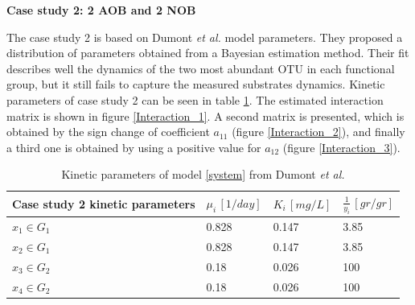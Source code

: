 \documentclass[3p,times]{article}
\begin{document}
\textbf{Case study 2: 2 AOB and 2 NOB}

 The case study 2 is based on Dumont \textit{et al.}\cite{Dumont2016} model parameters. They proposed a distribution of parameters obtained from a Bayesian estimation method. Their fit describes well the dynamics of the two most abundant OTU in each functional group, but it still fails to capture the measured substrates dynamics. Kinetic parameters of case study 2 can be seen in table \ref{kinetic_parameters}. The estimated interaction matrix is shown in figure \ref{Interaction_1}. A second matrix is presented, which is obtained by the sign change of coefficient $a_{11}$ (figure \ref{Interaction_2}), and finally a third one is obtained by using a positive value for $a_{12}$ (figure \ref{Interaction_3}). 

\begin{table}[ht]
	\centering
	\begin{tabular}{|l|l|l|l|}
		\hline
		Case study 2 kinetic parameters & $\mu_i\,[1/day]$ & $K_i\,[mg/L]$ & $\frac{1}{y_i} \, [gr/gr]$ \\ \hline
		$x_1 \in G_1$ & 0.828  & 0.147 & 3.85  \\ \hline
		$x_2\in G_1$ &0.828   & 0.147 &  3.85\\ \hline
		$x_3\in G_2$ & 0.18 & 0.026 &  100 \\ \hline
		$x_4\in G_2$ & 0.18 & 0.026 &  100 \\ \hline
	\end{tabular}
	\caption{Kinetic parameters of model \eqref{system} from Dumont \textit{et al.} \cite{Dumont2016}}
	\label{kinetic_parameters}
\end{table}
\end{document}
